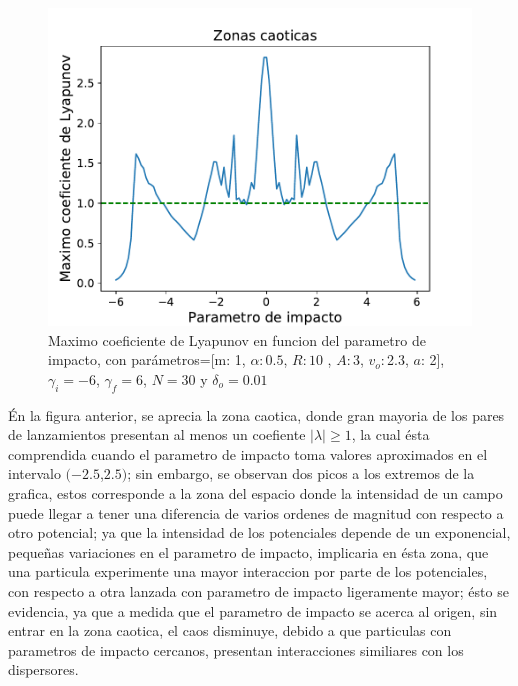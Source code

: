 \documentclass[11pt,letterpaper,twocolumn]{article}
\begin{document}
\begin{figure}[h!]
\centering 
\includegraphics[scale=0.55]{g9.pdf}
\caption{Maximo coeficiente de Lyapunov en funcion del parametro de impacto, con parámetros=[m: 1, $\alpha: 0$.$5$, $R: 10$ , $A: 3$, $ v_{o}: $2.$3$, $a$: 2], $\gamma_{i}=-6$, $\gamma_{f}=6$, $N=30$ y $\delta_{o}=0.01$}
\label{f8}
\end{figure}    
\par 
Én la figura anterior, se aprecia la zona caotica, donde gran mayoria de los pares de lanzamientos presentan al menos un coefiente $\vert \lambda \vert \geq 1$, la cual ésta comprendida cuando el parametro de impacto toma valores aproximados en el intervalo $(-2$.$5$,$2$.$5)$; sin embargo, se observan dos picos a los extremos de la grafica, estos corresponde a la zona del espacio donde la intensidad de un campo puede llegar a tener una diferencia de varios ordenes de magnitud con respecto a otro potencial; ya que la intensidad de los potenciales depende de un exponencial, pequeñas variaciones en el parametro de impacto, implicaria en ésta zona, que una particula experimente una mayor interaccion por parte de los potenciales, con respecto a otra lanzada con parametro de impacto ligeramente mayor; ésto se evidencia, ya que a medida que el parametro de impacto se acerca al origen, sin entrar en la zona caotica, el caos disminuye, debido a que particulas con parametros de impacto cercanos, presentan interacciones similiares con los dispersores.\\
\par 
\end{document}
